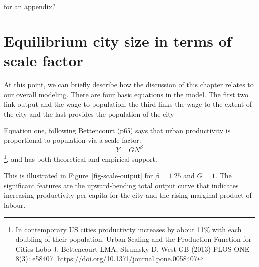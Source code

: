 \vspace{2cm}
\color{green}
\huge{for an appendix?}\normalsize
\section{Equilibrium city size  in terms of scale factor} 
At this point, we can briefly describe how the discussion of this chapter relates to our overall modeling. There are four basic equations in the model. The first two link output and the wage to population. the third links the wage to the extent of the city and the last  provides the population of the city

Equation one, following Bettencourt (p65) says that  urban productivity is proportional to population via a scale factor: 
\[Y= GN^{\beta}\]  
\footnote{ In contemporary US cities productivity increases by about 11\% with each doubling of their population.  Urban Scaling and the Production Function for Cities Lobo J, Bettencourt LMA, Strumsky D, West GB (2013) PLOS ONE 8(3): e58407. https://doi.org/10.1371/journal.pone.0058407 },
and has both theoretical and empirical support. 


This is illustrated in Figure~\ref{fig-scale-output} for $\beta=1.25$ and $G=1$. The significant features are the upward-bending total output curve that indicates increasing productivity per capita for the city and the rising marginal product of labour.


